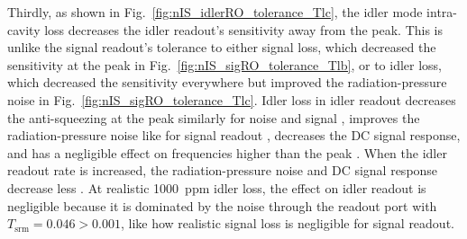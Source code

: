 Thirdly, as shown in Fig.~\ref{fig:nIS_idlerRO_tolerance_Tlc}, the idler mode intra-cavity loss decreases the idler readout's sensitivity away from the peak. This is unlike the signal readout's tolerance to either signal loss, which decreased the sensitivity at the peak in Fig.~\ref{fig:nIS_sigRO_tolerance_Tlb}, or to idler loss, which decreased the sensitivity everywhere but improved the radiation-pressure noise in Fig.~\ref{fig:nIS_sigRO_tolerance_Tlc}. Idler loss in idler readout decreases the anti-squeezing at the peak similarly for noise and signal , improves the radiation-pressure noise like for signal readout , decreases the DC signal response, and has a negligible effect on frequencies higher than the peak . When the idler readout rate is increased, the radiation-pressure noise and DC signal response decrease less . At realistic 1000~ppm idler loss, the effect on idler readout is negligible because it is dominated by the noise through the readout port with $T_\text{srm}=0.046>0.001$, like how realistic signal loss is negligible for signal readout.

